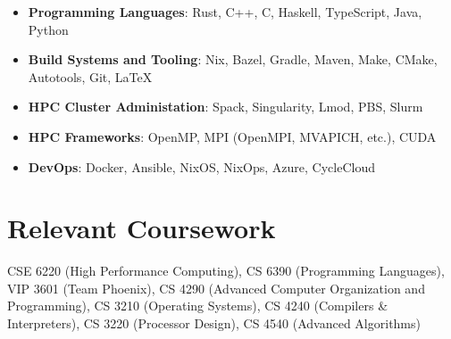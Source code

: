 \documentclass[letterpaper,11pt]{article}
\begin{document}
\begin{itemize}[leftmargin=0.15in,itemsep=1pt]
    \item \textbf{Programming Languages}: Rust, C++, C, Haskell, TypeScript, Java, Python
    \item \textbf{Build Systems and Tooling}: Nix, Bazel, Gradle, Maven, Make, CMake, Autotools, Git, \LaTeX{}
    \item \textbf{HPC Cluster Administation}: Spack, Singularity, Lmod, PBS, Slurm
    \item \textbf{HPC Frameworks}: OpenMP, MPI (OpenMPI, MVAPICH, etc.), CUDA
    \item \textbf{DevOps}: Docker, Ansible, NixOS, NixOps, Azure, CycleCloud
\end{itemize}\vspace{-5pt}

\section{Relevant Coursework}

CSE 6220 (High Performance Computing), CS 6390 (Programming Languages),
VIP 3601 (Team Phoenix), CS 4290 (Advanced Computer Organization and Programming), CS 3210 (Operating Systems), CS 4240 (Compilers \& Interpreters), CS 3220 (Processor Design), CS 4540 (Advanced Algorithms)
\end{document}
